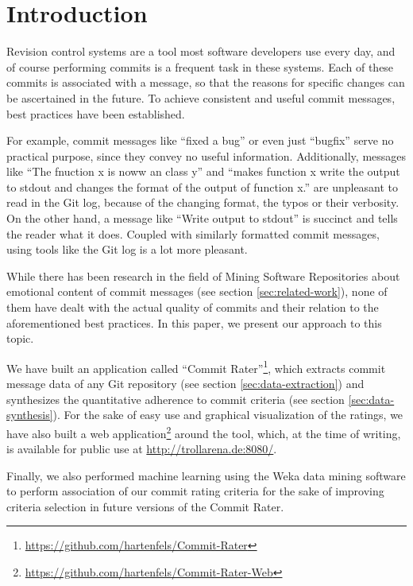 \section{Introduction}
\label{sec:introduction}

%
%
%
%
%
%

Revision control systems are a tool most software developers use every day, and of course performing commits is a frequent task in these systems. Each of these commits is associated with a message, so that the reasons for specific changes can be ascertained in the future\cite{CB}. To achieve consistent and useful commit messages, best practices have been established\cite{OffGuide,CB,TP,SR}.

For example, commit messages like ``fixed a bug'' or even just ``bugfix'' serve no practical purpose, since they convey no useful information. Additionally, messages like ``The fnuction x is noww an class y'' and ``makes function x write the output to stdout and changes the format of the output of function x.'' are unpleasant to read in the Git log, because of the changing format, the typos or their verbosity. On the other hand, a message like ``Write output to stdout'' is succinct and tells the reader what it does. Coupled with similarly formatted commit messages, using tools like the Git log is a lot more pleasant.

While there has been research in the field of Mining Software Repositories about emotional content of commit messages (see section \ref{sec:related-work}), none of them have dealt with the actual quality of commits and their relation to the aforementioned best practices. In this paper, we present our approach to this topic.

We have built an application called ``Commit Rater''\footnote{\url{https://github.com/hartenfels/Commit-Rater}}, which extracts commit message data of any Git repository (see section \ref{sec:data-extraction}) and synthesizes the quantitative adherence to commit criteria (see section \ref{sec:data-synthesis}). For the sake of easy use and graphical visualization of the ratings, we have also built a web application\footnote{\url{https://github.com/hartenfels/Commit-Rater-Web}} around the tool, which, at the time of writing, is available for public use at \url{http://trollarena.de:8080/}.

Finally, we also performed machine learning using the Weka data mining software\cite{Weka} to perform association of our commit rating criteria for the sake of improving criteria selection in future versions of the Commit Rater.
